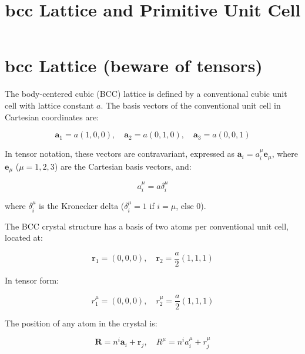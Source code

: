 \documentclass[a4paper,12pt]{article}
\newcommand{\bvec}[1]{\mathbf{#1}} %
\newcommand{\delt}{\delta} %
\begin{document}
	
	\title{bcc Lattice and Primitive Unit Cell}
	\maketitle
	
	\section{bcc Lattice (beware of tensors)}
	
	The body-centered cubic (BCC) lattice is defined by a conventional cubic unit cell with lattice constant \( a \). The basis vectors of the conventional unit cell in Cartesian coordinates are:
	
	\begin{equation}
		\bvec{a}_1 = a (1, 0, 0), \quad \bvec{a}_2 = a (0, 1, 0), \quad \bvec{a}_3 = a (0, 0, 1)
	\end{equation}
	
	In tensor notation, these vectors are contravariant, expressed as \(\bvec{a}_i = a_i^\mu \bvec{e}_\mu\), where \(\bvec{e}_\mu\) (\(\mu = 1, 2, 3\)) are the Cartesian basis vectors, and:
	
	\begin{equation}
		a_i^\mu = a \delt_i^\mu
	\end{equation}
	
	where \(\delt_i^\mu\) is the Kronecker delta (\(\delt_i^\mu = 1\) if \(i = \mu\), else 0).
	
	The BCC crystal structure has a basis of two atoms per conventional unit cell, located at:
	
	\begin{equation}
		\bvec{r}_1 = (0, 0, 0), \quad \bvec{r}_2 = \frac{a}{2} (1, 1, 1)
	\end{equation}
	
	In tensor form:
	
	\begin{equation}
		r_1^\mu = (0, 0, 0), \quad r_2^\mu = \frac{a}{2} (1, 1, 1)
	\end{equation}
	
	The position of any atom in the crystal is:
	
	\begin{equation}
		\bvec{R} = n^i \bvec{a}_i + \bvec{r}_j, \quad R^\mu = n^i a_i^\mu + r_j^\mu
	\end{equation}
	
\end{document}
